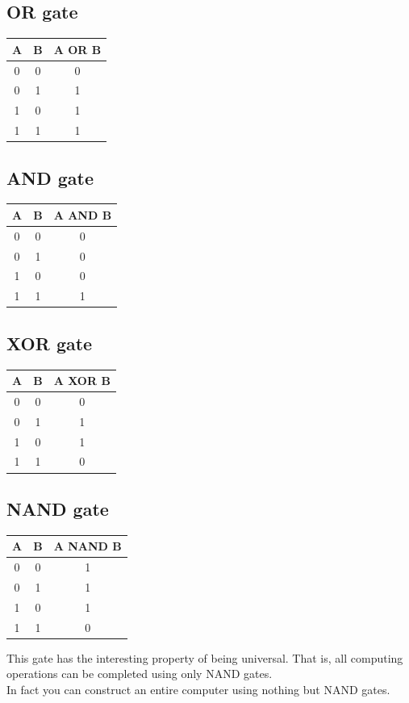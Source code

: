 \documentclass[12pt,oneside]{book}
\begin{document}
\subsection{OR gate}
\begin{center}
    \begin{tabular}{|c|c|c|}
        \hline
         A & B & A OR B \\ \hline
         0 & 0 & 0 \\ \hline
         0 & 1 & 1 \\ \hline
         1 & 0 & 1 \\ \hline
         1 & 1 & 1 \\ \hline
        \end{tabular}
\end{center}
\subsection{AND gate}
\begin{center}
    \begin{tabular}{|c|c|c|}
        \hline
         A & B & A AND B \\ \hline
         0 & 0 & 0 \\ \hline
         0 & 1 & 0 \\ \hline
         1 & 0 & 0 \\ \hline
         1 & 1 & 1 \\ \hline
        \end{tabular}
\end{center}
\subsection{XOR gate}
\begin{center}
    \begin{tabular}{|c|c|c|}
        \hline
         A & B & A XOR B \\ \hline
         0 & 0 & 0 \\ \hline
         0 & 1 & 1 \\ \hline
         1 & 0 & 1 \\ \hline
         1 & 1 & 0 \\ \hline
        \end{tabular}
\end{center}
\subsection{NAND gate}
\begin{center}
    \begin{tabular}{|c|c|c|}
        \hline
         A & B & A NAND B \\ \hline
         0 & 0 & 1 \\ \hline
         0 & 1 & 1 \\ \hline
         1 & 0 & 1 \\ \hline
         1 & 1 & 0 \\ \hline
        \end{tabular}
\end{center}
This gate has the interesting property of being universal. That is, all computing operations can be completed using only NAND gates.\\
In fact you can construct an entire computer using nothing but NAND gates.
\end{document}
